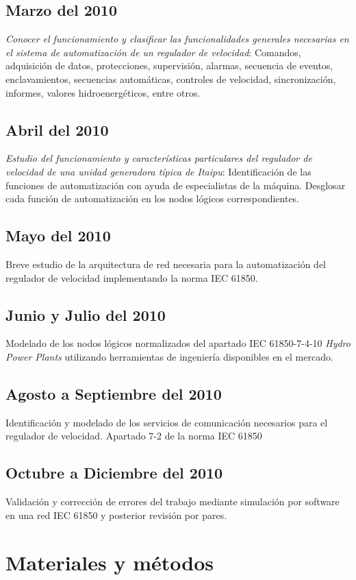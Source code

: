 \documentclass[conference,twocolumn]{IEEEtran}
\begin{document}
	\subsection{Marzo del 2010}
		\emph{Conocer el funcionamiento y clasificar las funcionalidades  generales necesarias en el sistema de automatizaci\'on de un regulador de velocidad}: Comandos, adquisici\'on de datos, protecciones, supervisi\'on, alarmas, secuencia de eventos, enclavamientos, secuencias autom\'aticas, controles de velocidad, sincronizaci\'on, informes, valores hidroenerg\'eticos, entre otros.
	\subsection{Abril del 2010}
		\emph{Estudio del funcionamiento y caracter\'isticas particulares del regulador de velocidad de una unidad generadora t\'ipica de Itaipu}: Identificaci\'on de las funciones de automatizaci\'on con ayuda de especialistas de la m\'aquina. Desglosar cada funci\'on de automatizaci\'on en los nodos l\'ogicos correspondientes.
	\subsection{Mayo del 2010}
		Breve estudio de la arquitectura de red necesaria para la automatizaci\'on del regulador de velocidad implementando la norma IEC 61850.
	\subsection{Junio y Julio del 2010}
		Modelado de los nodos l\'ogicos normalizados del apartado IEC 61850-7-4-10 \emph{Hydro Power Plants} utilizando herramientas de ingenier\'ia disponibles en el mercado.
	\subsection{Agosto a Septiembre del 2010}
		Identificaci\'on y modelado de los servicios de comunicaci\'on necesarios para el regulador de velocidad. Apartado 7-2 de la norma IEC 61850
	\subsection{Octubre a Diciembre del 2010}
			Validaci\'on y correcci\'on de errores del trabajo mediante simulaci\'on por software en una red IEC 61850 y posterior revisi\'on por pares.





\section{Materiales y m\'etodos}
\end{document}
